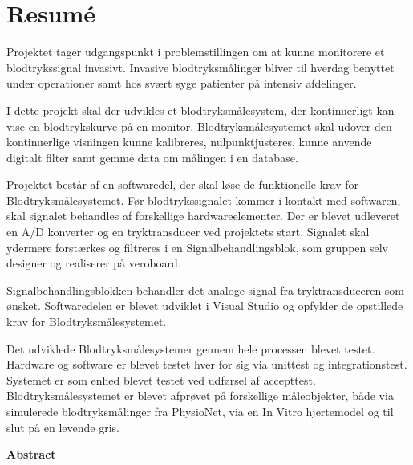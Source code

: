 \chapter{Resumé}
Projektet tager udgangspunkt i problemstillingen om at kunne monitorere et blodtrykssignal invasivt. Invasive blodtryksmålinger bliver til hverdag benyttet under operationer samt hos svært syge patienter på intensiv afdelinger. 

I dette projekt skal der udvikles et blodtryksmålesystem, der kontinuerligt kan vise en blodtrykskurve på en monitor. Blodtryksmålesystemet skal udover den kontinuerlige visningen kunne kalibreres, nulpunktjusteres, kunne anvende digitalt filter samt gemme data om målingen i en database. 

Projektet består af en softwaredel, der skal løse de funktionelle krav for Blodtryksmålesystemet. Før blodtrykssignalet kommer i kontakt med softwaren, skal signalet behandles af forskellige hardwareelementer. Der er blevet udleveret en A/D konverter og en tryktransducer ved projektets start. Signalet skal ydermere forstærkes og filtreres i en Signalbehandlingsblok, som gruppen selv designer og realiserer på veroboard.

Signalbehandlingsblokken behandler det analoge signal fra tryktransduceren som ønsket. Softwaredelen er blevet udviklet i Visual Studio og opfylder de opstillede krav for Blodtryksmålesystemet. 

Det udviklede Blodtryksmålesystemer gennem hele processen blevet testet. Hardware og software er blevet testet hver for sig via unittest og integrationstest. Systemet er som enhed blevet testet ved udførsel af accepttest. Blodtryksmålesystemet er blevet afprøvet på forskellige måleobjekter, både via simulerede blodtryksmålinger fra PhysioNet, via en In Vitro hjertemodel og til slut på en levende gris.


\textbf{Abstract}
